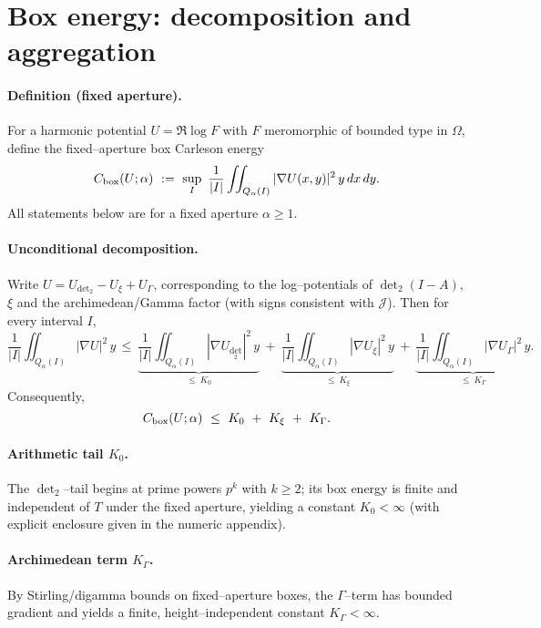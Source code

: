 
\section*{Box energy: decomposition and aggregation}

\paragraph{Definition (fixed aperture).}
For a harmonic potential $U=\Re\log F$ with $F$ meromorphic of bounded type in $\Omega$, define the fixed–aperture box Carleson energy
\[C_{\rm box}(U;\alpha)\ :=\ \sup_{I}\ \frac{1}{|I|}\iint_{Q_\alpha(I)} |\nabla U(x,y)|^2\,y\,dx\,dy.\]
All statements below are for a fixed aperture $\alpha\ge 1$.

\paragraph{Unconditional decomposition.}
Write $U=U_{\det_2}-U_\xi+U_\Gamma$, corresponding to the log–potentials of $\det_2(I-A)$, $\xi$ and the archimedean/Gamma factor (with signs consistent with $\mathcal J$). Then for every interval $I$,
\[\frac{1}{|I|}\iint_{Q_\alpha(I)} |\nabla U|^2\,y\,\le\ \underbrace{\frac{1}{|I|}\iint_{Q_\alpha(I)} |\nabla U_{\det_2}|^2\,y}_{\le\ K_0}\ +\ \underbrace{\frac{1}{|I|}\iint_{Q_\alpha(I)} |\nabla U_\xi|^2\,y}_{\le\ K_\xi}\ +\ \underbrace{\frac{1}{|I|}\iint_{Q_\alpha(I)} |\nabla U_\Gamma|^2\,y}_{\le\ K_\Gamma}.\]
Consequently,
\begin{equation}\label{eq:cbox-split}
C_{\rm box}(U;\alpha)\ \le\ K_0\ +\ K_\xi\ +\ K_\Gamma.
\end{equation}

\paragraph{Arithmetic tail $K_0$.}
The $\det_2$–tail begins at prime powers $p^k$ with $k\ge2$; its box energy is finite and independent of $T$ under the fixed aperture, yielding a constant $K_0<\infty$ (with explicit enclosure given in the numeric appendix).

\paragraph{Archimedean term $K_\Gamma$.}
By Stirling/digamma bounds on fixed–aperture boxes, the $\Gamma$–term has bounded gradient and yields a finite, height–independent constant $K_\Gamma<\infty$.

